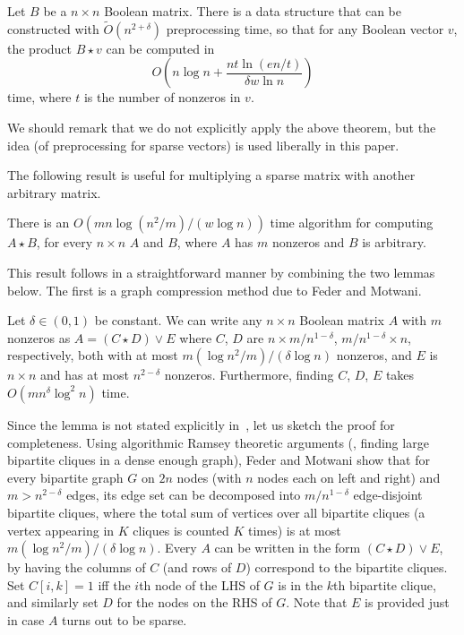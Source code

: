 \begin{theorem}
Let $B$ be a $n \times n$ Boolean matrix.  There is a data structure that can be constructed with $\tilde{O}(n^{2+\delta})$ preprocessing time, so that for any Boolean vector $v$, the product $B \star v$ can be computed in 
$$
O\left(n \log n + \frac{n t \ln(en/t)}{\delta w \ln n }\right)
$$
time, where $t$ is the number of nonzeros in $v$.
\end{theorem}

We should remark that we do not explicitly apply the above theorem, but the idea (of preprocessing for sparse vectors) is used liberally in this paper.

The following result is useful for multiplying a sparse matrix with another arbitrary matrix.
\begin{theorem}\label{sparsemm} There is an $O(m n \log(n^2/m)/(w\log n))$ time algorithm for computing $A \star B$, for every $n\times n$ $A$ and $B$, where $A$ has $m$ nonzeros and $B$ is arbitrary.
\end{theorem}
This result follows in a straightforward manner by combining the two lemmas below.
The first is a graph compression method due to Feder and Motwani.

\begin{lemma}\label{sparseramsey} Let $\delta \in (0,1)$ be constant. We can write any $n \times n$ Boolean matrix $A$ with $m$ nonzeros as $A = (C \star D) \vee E$ where $C$, $D$ are $n \times m/n^{1-\delta}$, $m/n^{1-\delta} \times n$, respectively, both with at most $m (\log n^2/m)/(\delta \log n)$ nonzeros, and $E$ is $n \times n$ and has at most $n^{2-\delta}$ nonzeros. Furthermore, finding $C$, $D$, $E$ takes $O(mn^{\delta}\log^2 n)$ time.\end{lemma}

Since the lemma is not stated explicitly in~\cite{federmotwani}, let us sketch the proof for completeness. Using algorithmic Ramsey theoretic arguments (\ie, finding large bipartite cliques in a dense enough graph), Feder and Motwani show that for every bipartite graph $G$ on $2n$ nodes (with $n$ nodes each on left and right) and $m>n^{2-\delta}$ edges, its edge set can be decomposed into $m/n^{1-\delta}$ edge-disjoint bipartite cliques, where the total sum of vertices over all bipartite cliques (a vertex appearing in $K$ cliques is counted $K$ times) is at most $m (\log n^2/m)/(\delta \log n)$. Every $A$ can be written in the form $(C \star D) \vee E$, by having the columns of $C$ (and rows of $D$) correspond to the bipartite cliques. Set $C[i,k]=1$ iff the $i$th node of the LHS of $G$ is in the $k$th bipartite clique, and similarly set $D$ for the nodes on the RHS of $G$. Note that  $E$ is provided just in case $A$ turns out to be sparse.

